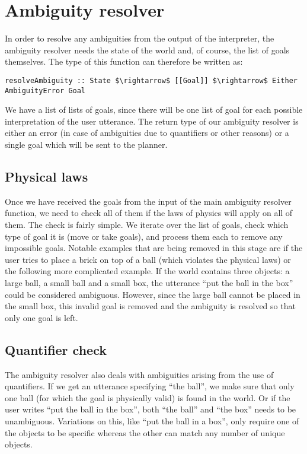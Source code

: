 
\section*{Ambiguity resolver}
In order to resolve any ambiguities from the output of the interpreter, the ambiguity resolver needs the state of the world and, of course, the list of goals themselves.
The type of this function can therefore be written as:
\begin{lstlisting}
resolveAmbiguity :: State $\rightarrow$ [[Goal]] $\rightarrow$ Either AmbiguityError Goal
\end{lstlisting}

We have a list of lists of goals, since there will be one list of goal for each possible interpretation of the user utterance.
The return type of our ambiguity resolver is either an error (in case of ambiguities due to quantifiers or other reasons) or a single goal which will be sent to the planner.

\subsection*{Physical laws}
Once we have received the goals from the input of the main ambiguity resolver function, we need to check all of them if the laws of physics will apply on all of them.
The check is fairly simple.
We iterate over the list of goals, check which type of goal it is (move or take goals), and process them each to remove any impossible goals.
Notable examples that are being removed in this stage are if the user tries to place a brick on top of a ball (which violates the physical laws) or the following more complicated example.
If the world contains three objects: a large ball, a small ball and a small box, the utterance ``put the ball in the box'' could be considered ambiguous.
However, since the large ball cannot be placed in the small box, this invalid goal is removed and the ambiguity is resolved so that only one goal is left.

\subsection*{Quantifier check}
The ambiguity resolver also deals with ambiguities arising from the use of quantifiers.
If we get an utterance specifying ``the ball'', we make sure that only one ball (for which the goal is physically valid) is found in the world.
Or if the user writes ``put the ball in the box'', both ``the ball'' and ``the box'' needs to be unambiguous.
Variations on this, like ``put the ball in a box'', only require one of the objects to be specific whereas the other can match any number of unique objects.

